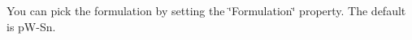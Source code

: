 You can pick the formulation by setting the \char`\"{}Formulation\char`\"{} property. The default is pW-Sn. 
